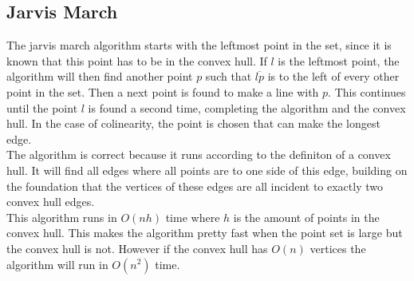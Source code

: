 \documentclass{article}
\begin{document}
\subsection*{Jarvis March}
The jarvis march algorithm starts with the leftmost point in the set, since it is known that this point has to be in the convex hull. 
If $l$ is the leftmost point, the algorithm will then find another point $p$ such that $\overline{lp}$ is to the left of every other point in the set. 
Then a next point is found to make a line with $p$. This continues until the point $l$ is found a second time, completing the algorithm and the convex hull.
In the case of colinearity, the point is chosen that can make the longest edge.
\\
The algorithm is correct because it runs according to the definiton of a convex hull. 
It will find all edges where all points are to one side of this edge, building on the foundation that the vertices of these edges are all incident to exactly two convex hull edges.
\\
This algorithm runs in $O(nh)$ time where $h$ is the amount of points in the convex hull. This makes the algorithm pretty fast when the point set is large but the convex hull is not.
However if the convex hull has $O(n)$ vertices the algorithm will run in $O(n^2)$ time.
\end{document}
